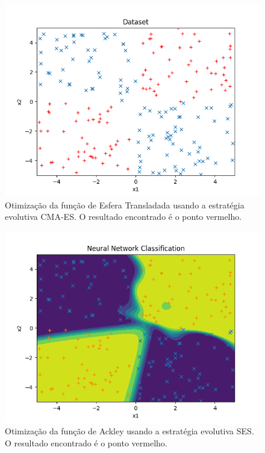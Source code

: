 \documentclass[conference]{IEEEtran}
\begin{document}
\begin{figure}[htbp]
\centering
\centerline{\includegraphics[scale=0.5]{imagens/xor/dataset.png}}
\caption{Otimização da função de Esfera Transladada usando a estratégia evolutiva CMA-ES. O resultado encontrado é o ponto vermelho.}
\label{xor/dataset}
\end{figure}

\begin{figure}[htbp]
\centering
\centerline{\includegraphics[scale=0.5]{imagens/xor/neural_net_classification.png}}
\caption{Otimização da função de Ackley usando a estratégia evolutiva SES. O resultado encontrado é o ponto vermelho.}
\label{xor/neural_net_classification}
\end{figure} 
\end{document}
